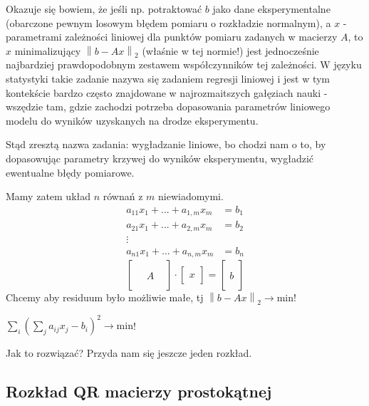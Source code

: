 \documentclass[hidelinks,a4paper,fleqn]{article}
\newcommand{\ra}{\rightarrow}
\newcommand{\norm}[1]{\left\lVert#1\right\rVert}
\begin{document}
Okazuje się bowiem, że jeśli np. potraktować $b$ jako dane eksperymentalne (obarczone pewnym losowym błędem pomiaru o rozkładzie normalnym), a $x$ - parametrami zależności liniowej dla punktów pomiaru zadanych w macierzy $A$, to $x$ minimalizujący $\norm{b-Ax}_2$ (właśnie w tej normie!) jest jednocześnie najbardziej prawdopodobnym zestawem współczynników tej zależności. W języku statystyki takie zadanie nazywa się zadaniem regresji liniowej i jest w tym kontekście bardzo często znajdowane w najrozmaitszych gałęziach nauki - wszędzie tam, gdzie zachodzi potrzeba dopasowania parametrów liniowego modelu do wyników uzyskanych na drodze eksperymentu.

Stąd zresztą nazwa zadania: wygładzanie liniowe, bo chodzi nam o to, by dopasowując parametry krzywej do wyników eksperymentu, wygładzić ewentualne błędy pomiarowe.

Mamy zatem układ $n$ równań z $m$ niewiadomymi.
\begin{align*}
	a_{11}x_{1} + ... + a_{1, m}x_m & = b_1 \\
	a_{21}x_{1} + ... + a_{2, m}x_m & = b_2 \\
	\vdots & \\
	a_{n1}x_{1} + ... + a_{n, m}x_m & = b_n
\end{align*}
\[
\left[
	\begin{array}{cc}
	 \\
	 \\
	 \quad A 
	 \\
	 \\ &
	\end{array}
\right]
	\cdot
\left[
	\begin{array}{c}
	 \\
	 x
	 \\ \ 
	\end{array}
\right]
=
\left[
	\begin{array}{c}
	 \\
	 \\
	 b
	 \\
	 \\ \ 
	\end{array}
\right]
\]
Chcemy aby residuum było możliwie małe, tj $\norm{b - Ax}_2 \ra \textrm{min}$!

$\sum_{i}(\sum_{j} a_{ij} x_{j} - b_{i})^2 \ra \textrm{min}$!

Jak to rozwiązać? Przyda nam się jeszcze jeden rozkład.

\subsection{Rozkład QR macierzy prostokątnej}
\end{document}
